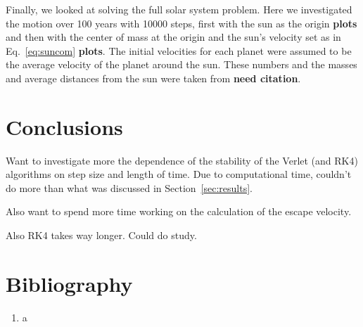\documentclass[12pt]{article}
\numberwithin{equation}{section}
\begin{document}
\par Finally, we looked at solving the full solar system problem.  Here we investigated the motion over 100 years with 10000 steps, first with the sun as the origin \textbf{plots} and then with the center of mass at the origin and the sun's velocity set as in Eq.~\ref{eq:suncom} \textbf{plots}.  The initial velocities for each planet were assumed to be the average velocity of the planet around the sun.  These numbers and the masses and average distances from the sun were taken from \textbf{need citation}.

\section{Conclusions}
\label{sec:conclusions}

Want to investigate more the dependence of the stability of the Verlet (and RK4) algorithms on step size and length of time.  Due to computational time, couldn't do more than what was discussed in Section~\ref{sec:results}.
\par Also want to spend more time working on the calculation of the escape velocity.
\par Also RK4 takes way longer.  Could do study.

\section{Bibliography}
\label{sec:bib}

\begin{enumerate}

\item a

\end{enumerate}
\end{document}
